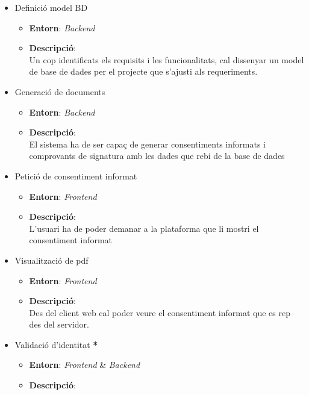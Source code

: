 \begin{itemize}
    \item Definició model BD
        \begin{itemize}
            \item \textbf{Entorn}: \textit{Backend}
            \item \textbf{Descripció}:\\
            Un cop identificats els requisits i les funcionalitats, cal dissenyar un model de base de dades per el projecte que s'ajusti als requeriments.
        \end{itemize}
    \item Generació de documents
        \begin{itemize}
            \item \textbf{Entorn}: \textit{Backend}
            \item \textbf{Descripció}: \\
            El sistema ha de ser capaç de generar consentiments informats i comprovants de signatura amb les dades que rebi de la base de dades
        \end{itemize}
        \item Petició de consentiment informat
        \begin{itemize}
            \item \textbf{Entorn}: \textit{Frontend}
            \item \textbf{Descripció}: \\
            L'usuari ha de poder demanar a la plataforma que li mostri el consentiment informat
        \end{itemize}
    \item Visualització de pdf
        \begin{itemize}
            \item \textbf{Entorn}: \textit{Frontend}
            \item \textbf{Descripció}: \\
            Des del client web cal poder veure el consentiment informat que es rep des del servidor.
        \end{itemize}
    \item Validació d'identitat \textbf{*}
        \begin{itemize}
            \item \textbf{Entorn}: \textit{Frontend} \& \textit{Backend}
            \item \textbf{Descripció}:
            \begin{itemize}

\end{itemize}
\end{itemize}
\end{itemize}
